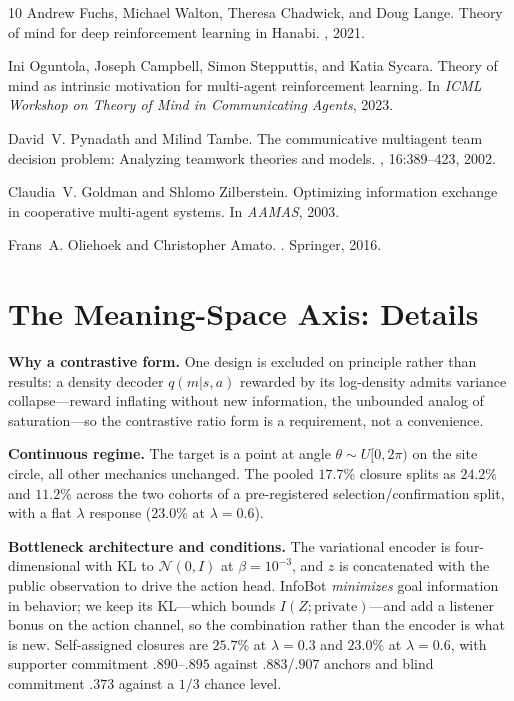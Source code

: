 \documentclass[sigconf,review,anonymous]{acmart}
\begin{document}
\begin{thebibliography}{10}
Andrew Fuchs, Michael Walton, Theresa Chadwick, and Doug Lange.
\newblock Theory of mind for deep reinforcement learning in Hanabi.
, 2021.

Ini Oguntola, Joseph Campbell, Simon Stepputtis, and Katia Sycara.
\newblock Theory of mind as intrinsic motivation for multi-agent reinforcement learning.
\newblock In {\em ICML Workshop on Theory of Mind in Communicating Agents}, 2023.

David~V. Pynadath and Milind Tambe.
\newblock The communicative multiagent team decision problem: Analyzing teamwork theories and models.
, 16:389--423, 2002.

Claudia~V. Goldman and Shlomo Zilberstein.
\newblock Optimizing information exchange in cooperative multi-agent systems.
\newblock In {\em AAMAS}, 2003.

Frans~A. Oliehoek and Christopher Amato.
.
\newblock Springer, 2016.

\end{thebibliography}

\appendix

\section{The Meaning-Space Axis: Details}
\label{app:meaning}

\textbf{Why a contrastive form.} One design is excluded on principle rather than results: a density decoder $q(m|s,a)$ rewarded by its log-density admits variance collapse---reward inflating without new information, the unbounded analog of saturation---so the contrastive ratio form is a requirement, not a convenience.

\textbf{Continuous regime.} The target is a point at angle $\theta\sim U[0,2\pi)$ on the site circle, all other mechanics unchanged. The pooled $17.7\%$ closure splits as $24.2\%$ and $11.2\%$ across the two cohorts of a pre-registered selection/confirmation split, with a flat $\lambda$ response ($23.0\%$ at $\lambda{=}0.6$).

\textbf{Bottleneck architecture and conditions.} The variational encoder is four-dimensional with KL to $\mathcal{N}(0,I)$ at $\beta{=}10^{-3}$, and $z$ is concatenated with the public observation to drive the action head. InfoBot \emph{minimizes} goal information in behavior; we keep its KL---which bounds $I(Z;\text{private})$---and add a listener bonus on the action channel, so the combination rather than the encoder is what is new. Self-assigned closures are $25.7\%$ at $\lambda{=}0.3$ and $23.0\%$ at $\lambda{=}0.6$, with supporter commitment $.890$--$.895$ against $.883$/$.907$ anchors and blind commitment $.373$ against a $1/3$ chance level.
\end{document}
